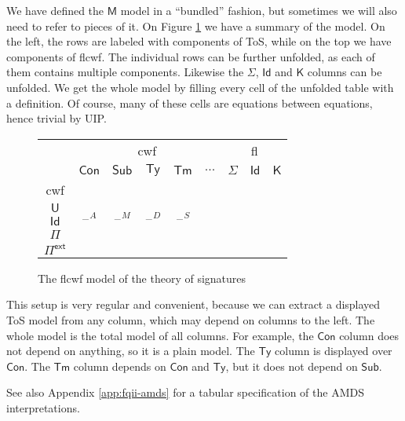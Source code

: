 \documentclass[12pt,a4paper,twoside,openany]{book}
\theoremstyle{remark}
\theoremstyle{definition}
\theoremstyle{theorem}
\newcommand{\bs}[1]{\boldsymbol{#1}}
\newcommand{\Con}{\mathsf{Con}}
\newcommand{\Sub}{\mathsf{Sub}}
\newcommand{\Tm}{\mathsf{Tm}}
\newcommand{\Ty}{\mathsf{Ty}}
\newcommand{\U}{\mathsf{U}}
\newcommand{\Id}{\mathsf{Id}}
\newcommand{\blank}{\mathord{\hspace{1pt}\text{--}\hspace{1pt}}}
\newcommand{\Pie}{\Pi^{\mathsf{ext}}}
\newcommand{\K}{\mathsf{K}}
\newcommand{\bM}{\bs{\mathsf{M}}}
\begin{document}
We have defined the $\bM$ model in a ``bundled'' fashion, but sometimes we will
also need to refer to pieces of it. On Figure \ref{fig:fqiit-model} we have a
summary of the model. On the left, the rows are labeled with components of ToS,
while on the top we have components of flcwf. The individual rows can be further
unfolded, as each of them contains multiple components. Likewise the $\Sigma$,
$\Id$ and $\K$ columns can be unfolded. We get the whole model by filling every
cell of the unfolded table with a definition. Of course, many of these cells are
equations between equations, hence trivial by UIP.

\begin{figure}
\begin{center}
\begin{tabular}{ |c|c|c|c|c|c|c|c|c|  }
 \hline
   & \multicolumn{5}{|c|}{cwf} & \multicolumn{3}{c|}{fl}\\
 \cline{2-9}
   & $\Con$ & $\Sub$ & $\Ty$ & $\Tm$ & $...$ & $\Sigma$ & $\Id$ & $\K$ \\
 \hline
   cwf    & \multirow{5}{2em}{$\blank^A$}&\multirow{5}{2em}{$\blank^M$}&\multirow{5}{2em}{$\blank^D$}&\multirow{5}{2em}{$\blank^S$}& & & & \\
   $\U$   &                              &              &                  &    & & & & \\
   $\Id$  &                              &              &                  &    & & & & \\
   $\Pi$  &                              &              &                  &    & & & & \\
   $\Pie$ &                              &              &                  &    & & & & \\
 \hline
\end{tabular}
\end{center}
\caption{The flcwf model of the theory of signatures}
\label{fig:fqiit-model}
\end{figure}

This setup is very regular and convenient, because we can extract a displayed
ToS model from any column, which may depend on columns to the left. The whole
model is the total model of all columns. For example, the $\Con$ column does not
depend on anything, so it is a plain model. The $\Ty$ column is displayed over
$\Con$. The $\Tm$ column depends on $\Con$ and $\Ty$, but it does not depend on $\Sub$.

See also Appendix \ref{app:fqii-amds} for a tabular specification of the AMDS
interpretations.
\end{document}
